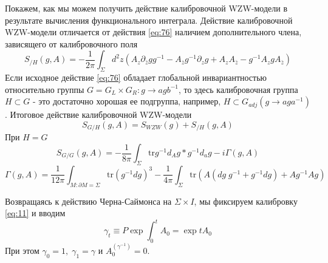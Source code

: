 \documentclass[a4paper,12pt]{article}
\theoremstyle{definition} \newtheorem{Def}{Definition}
\begin{document}
Покажем, как мы можем получить действие калибровочной WZW-модели в результате вычисления функционального интеграла. 
Действие калибровочной WZW-модели отличается от действия \eqref{eq:76} наличием дополнительного члена, зависящего от калибровочного поля
\begin{equation}
  \label{eq:15}
  S_{/H}(g,A)=-\frac{1}{2\pi}\int_{\Sigma}d^2z (A_z\partial_{\bar z} g g^{-1}-A_{\bar z} g^{-1}\partial_z g+ A_z A_{\bar z} - g^{-1}A_z g A_{\bar z})
\end{equation}
Если исходное действие \eqref{eq:76} обладает глобальной инвариантностью относительно группы $G=G_L\times G_R: g\to a g b^{-1}$, то здесь калибровочная группа $H\subset G$ - это достаточно хорошая ее подгруппа, например, $H\subset G_{adj}(g\to a g a^{-1})$. Итоговое действие калибровочной WZW-модели
\begin{equation}
  \label{eq:16}
  S_{G/H}(g,A)=S_{WZW}(g)+S_{/H}(g,A)
\end{equation}
При $H=G$
\begin{equation}
  \label{eq:17}
  S_{G/G}(g,A)=-\frac{1}{8\pi}\int_{\Sigma} \mathrm{tr} g^{-1} d_A g * g^{-1} d_a g-i\Gamma(g,A)
\end{equation}
\begin{equation}
  \label{eq:18}
  \Gamma(g,A)=\frac{1}{12\pi}\int_{M:\partial M=\Sigma}\mathrm{tr}(g^{-1}dg)^3-\frac{1}{4\pi}\int_{\Sigma}\mathrm{tr}\left(A(dg\; g^{-1}+g^{-1} dg)+Ag^{-1} A g\right)
\end{equation}

Возвращаясь к действию Черна-Саймонса на $\Sigma\times I$, мы фиксируем калибровку \eqref{eq:11} и вводим
\begin{equation}
  \label{eq:19}
  \gamma_t\equiv P\exp\int_0^t A_0=\exp tA_0
\end{equation}
При этом $\gamma_0=1,\; \gamma_1=\gamma$ и $A^{(\gamma^{-1})}_0=0$.
\end{document}
